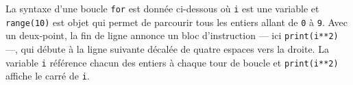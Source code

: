 
La syntaxe d'une boucle \texttt{for} est donnée ci-dessous où \texttt{i} est une variable et \texttt{range(10)} est objet qui permet de parcourir tous les entiers allant de \texttt{0} à \texttt{9}. Avec un deux-point, la fin de ligne annonce un bloc d'instruction ---  ici \texttt{print(i**2)} ---, qui débute à la ligne suivante décalée de quatre espaces vers la droite. La variable \texttt{i} référence chacun des entiers à chaque tour de boucle et \texttt{print(i**2)} affiche le carré de \texttt{i}.

